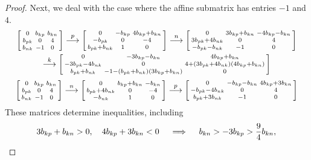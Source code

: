 \documentclass{amsart}
\theoremstyle{definition}
\theoremstyle{remark}
\numberwithin{equation}{section}
\newcommand{\0}{{\mathbf{0}}}
\begin{document}
\begin{proof}
Next, we deal with the case where the affine submatrix has entries $-1$ and $4$.
\begin{multline*}
\begin{bsmallmatrix*}
	0 & b_{kp} & b_{kn} \\
	b_{pk} & 0 & 4	 \\
	b_{nk} & -1 & 0
\end{bsmallmatrix*}
\overset{p}{\longrightarrow}
\begin{bsmallmatrix*}
	0 & -b_{kp} & 4b_{kp}+b_{kn} \\
	-b_{pk} & 0 & -4 \\
	b_{pk}+b_{nk}& 1 & 0
\end{bsmallmatrix*}
\overset{n}{\longrightarrow}
\begin{bsmallmatrix*}
	0 & 3b_{kp}+b_{kn}& -4b_{kp}-b_{kn} \\
	3b_{pk}+4b_{nk} & 0 & 4 \\
	-b_{pk}-b_{nk}& -1 & 0
\end{bsmallmatrix*}\\
\overset{k}{\longrightarrow}
\begin{bsmallmatrix*}
	0 & -3b_{kp}-b_{kn}& 4b_{kp}+b_{kn} \\
	-3b_{pk}-4b_{nk} & 0 & 4+(3b_{pk}+4b_{nk})(4b_{kp}+b_{kn}) \\
	b_{pk}+b_{nk}& -1-(b_{pk}+b_{nk})(3b_{kp}+b_{kn}) & 0
\end{bsmallmatrix*}
\end{multline*}
\begin{multline*}
\begin{bsmallmatrix*}
	0 & b_{kp} & b_{kn} \\
	b_{pk} & 0 & 4	 \\
	b_{nk} & -1 & 0
\end{bsmallmatrix*}\overset{n}{\longrightarrow}
\begin{bsmallmatrix*}
	0 & b_{kp}+b_{kn} & -b_{kn} \\
	b_{pk}+4b_{nk} & 0 & -4	 \\
	-b_{nk} & 1 & 0
\end{bsmallmatrix*}\overset{p}{\longrightarrow}
\begin{bsmallmatrix*}
	0 & -b_{kp}-b_{kn} & 4b_{kp}+3b_{kn} \\
	-b_{pk}-4b_{nk} & 0 & 4	 \\
	b_{pk}+3b_{nk} & -1 & 0
\end{bsmallmatrix*}
\end{multline*}
These matrices determine inequalities, including
\[
3b_{kp}+b_{kn}>0,\quad 4b_{kp}+3b_{kn}<0\quad \implies\quad b_{kn}>-3b_{kp}>\frac94b_{kn},\\
\]
\end{proof}
\end{document}
